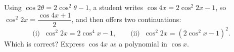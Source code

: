 Using $\cos2\theta=2\cos^2\theta-1$, a student writes $\cos4x=2\cos^2 2x-1$, so $\cos^2 2x=\dfrac{\cos4x+1}{2}$, and then offers two continuations:
\[
\text{(i) }\ \cos^2 2x=2\cos^4x-1,\qquad\text{(ii) }\ \cos^2 2x=(2\cos^2x-1)^2.
\]
Which is correct? Express $\cos4x$ as a polynomial in $\cos x$.
